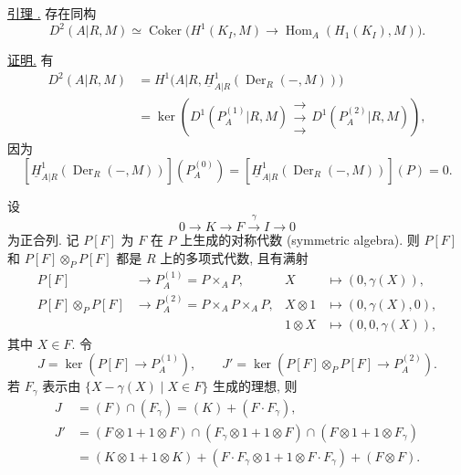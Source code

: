 \underline{引理 .} 存在同构
\[
 D^2(A|R,M)\simeq
 \operatorname{Coker}\bigl(
 H^1(K_I,M)\longrightarrow
 \operatorname{Hom}_A(H_1(K_I),M)\bigr).
\]

\underline{证明.} 有
\begin{align*}
D^2(A|R,M)
 &=H^1\bigl(A|R,
   \underline H^1_{A|R}(\operatorname{Der}_R(-,M))\bigr)\\
 &=\ker\left(
   D^1(P_A^{(1)}|R,M)
   \mathrel{\substack{\longrightarrow\\[-.6ex]\longrightarrow\\[-.6ex]\longrightarrow}}
   D^1(P_A^{(2)}|R,M)\right),
\end{align*}
因为
\[
 [\underline H^1_{A|R}(\operatorname{Der}_R(-,M))](P_A^{(0)})
 =[\underline H^1_{A|R}(\operatorname{Der}_R(-,M))](P)=0.
\]

设
\[
 0\longrightarrow K\longrightarrow F\xrightarrow{\gamma}I
 \longrightarrow0
\]
为正合列. 记 $P[F]$ 为 $F$ 在 $P$ 上生成的对称代数 (symmetric algebra). 则 $P[F]$ 和
$P[F]\otimes_PP[F]$ 都是 $R$ 上的多项式代数, 且有满射
\begin{align*}
P[F]&\longrightarrow P_A^{(1)}=P\times_AP,
&X&\longmapsto(0,\gamma(X)),\\
P[F]\otimes_PP[F]&\longrightarrow
P_A^{(2)}=P\times_AP\times_AP,
&X\otimes1&\longmapsto(0,\gamma(X),0),\\[-.3ex]
&&1\otimes X&\longmapsto(0,0,\gamma(X)),
\end{align*}
其中 $X\in F$. 令
\[
 J=\ker(P[F]\longrightarrow P_A^{(1)}),
 \qquad
 J'=\ker(P[F]\otimes_PP[F]\longrightarrow P_A^{(2)}).
\]
若 $F_\gamma$ 表示由 $\{X-\gamma(X)\mid X\in F\}$ 生成的理想, 则
\begin{align*}
J&=(F)\cap(F_\gamma)=(K)+(F\cdot F_\gamma),\\
J'&=(F\otimes1+1\otimes F)
 \cap(F_\gamma\otimes1+1\otimes F)
 \cap(F\otimes1+1\otimes F_\gamma)\\
&=(K\otimes1+1\otimes K)
 +(F\cdot F_\gamma\otimes1+1\otimes F\cdot F_\gamma)
 +(F\otimes F).
\end{align*}


